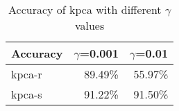 \begin{table}[htb!]
  \centering
  \begin{tabular}{lrr}
    \toprule
     Accuracy & $\gamma$=0.001 & $\gamma$=0.01 \\
    \midrule
    kpca-r & 89.49\% & 55.97\% \\
    kpca-s & 91.22\% & 91.50\% \\
    \bottomrule
  \end{tabular}
  \caption{Accuracy of \gls{kpca} with different $\gamma$ values}
  \label{tab:gamma-values-kpca}
\end{table}